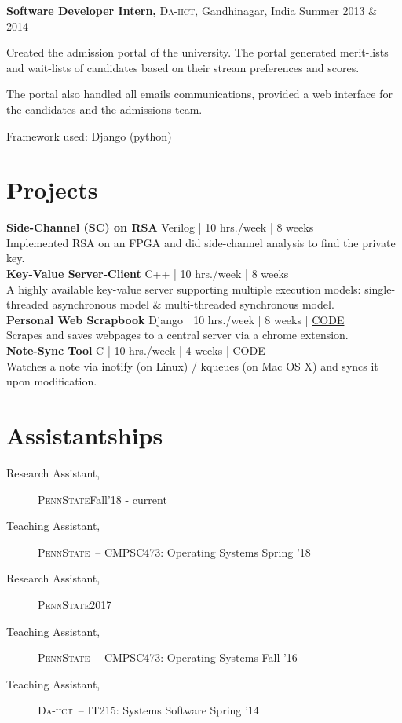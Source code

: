 \documentclass[margin]{res}
\newcommand{\daiict}{\textsc{Da-iict}}
\newcommand{\psu}{\textsc{PennState}}
\begin{document}
\begin{resume}
{\bf Software Developer Intern,} \daiict, Gandhinagar, India
\hfill Summer 2013 \& 2014 %
\begin{itemizeexp}
    \item Created the admission portal of the university. The portal generated
    merit-lists and wait-lists of candidates based on their stream preferences
    and scores. 
    \item The portal also handled all emails communications, provided a
    web interface for the candidates and the admissions team.
    \item Framework used: Django (python)
\end{itemizeexp}

\section{Projects}
{\bfseries Side-Channel (SC) on RSA}\hfill
{\small Verilog | 10 hrs./week | 8 weeks}\\
Implemented RSA on an FPGA and did side-channel analysis to find the private key.\\[2ex]

{\bfseries Key-Value Server-Client}\hfill
{\small C++ | 10 hrs./week | 8 weeks}\\
A highly available key-value server supporting multiple execution models:
single-threaded asynchronous model \& multi-threaded synchronous model.\\[2ex]

{\bfseries Personal Web Scrapbook}\hfill
{\small Django | 10 hrs./week | 8 weeks | \href{https://bitbucket.org/mitthu/capsule/src/}{CODE}}\\
Scrapes and saves webpages to a central server via a chrome extension.\\[2ex]

{\bfseries Note-Sync Tool}\hfill
{\small C | 10 hrs./week | 4 weeks | \href{https://github.com/mitthu/note-sync}{CODE}}\\
Watches a note via inotify (on Linux) / kqueues (on Mac OS X) and syncs it upon modification.

\section{Assistantships} 
\begin{description}
    \item[Research Assistant,] \psu \hfill Fall'18 - current
    \item[Teaching Assistant,] \psu\ -- CMPSC473: Operating Systems \hfill Spring '18 %
    \item[Research Assistant,] \psu \hfill 2017
    \item[Teaching Assistant,] \psu\ -- CMPSC473: Operating Systems \hfill Fall '16 %
    \item[Teaching Assistant,] \daiict\ -- IT215: Systems Software \hfill Spring '14 %
\end{description}


\end{resume}
\end{document}
